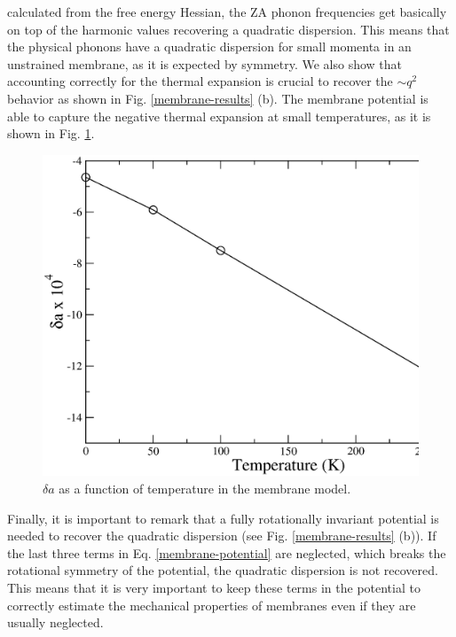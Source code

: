 calculated from the free energy Hessian, the ZA phonon frequencies get basically on top of the harmonic values 
recovering a quadratic dispersion. This means that the physical phonons have a quadratic dispersion for small momenta 
in an unstrained membrane, as it is expected by symmetry. We also show that accounting correctly for the thermal 
expansion is crucial to recover the $\sim q^2$ behavior as shown in Fig. \ref{membrane-results} (b). The membrane 
potential is able to capture the negative thermal expansion at small temperatures, as it is shown in 
Fig. \ref{cte-membrane}. 
\begin{figure}[ht]
\includegraphics[width=0.8\linewidth]{Figures/cte-membrane.eps}
\caption{$\delta a$ as a function of temperature in the membrane model.}
\label{cte-membrane}
\end{figure}
Finally, it is important to remark that a fully rotationally invariant potential is needed to recover the quadratic 
dispersion (see Fig. \ref{membrane-results} (b)). If the last three terms in Eq. \ref{membrane-potential} are 
neglected, which breaks the rotational symmetry of the potential, the quadratic dispersion is not recovered. This 
means that it is very important to keep these terms in the potential to correctly estimate the mechanical properties 
of membranes even if they are usually neglected\cite{mariani2008flexural,amorim2014thermodynamics,de2012bending}. \\

